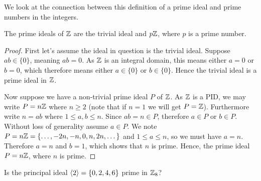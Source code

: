 We look at the connection between this definition of a prime ideal and prime numbers in the integers.
\begin{proposition}\label{prop-ideals-of-Z}
    The prime ideals of $\mathbb{Z}$ are the trivial ideal and $p\mathbb{Z}$, where $p$ is a prime number.
\end{proposition}
\begin{proof}
    First let's assume the ideal in question is the trivial ideal. Suppose $ab \in \{0\}$, meaning $ab = 0$. As $\mathbb{Z}$ is an integral domain, this means either $a = 0$ or $b = 0$, which therefore means either $a \in \{0\}$ or $b \in \{0\}$. Hence the trivial ideal is a prime ideal in $\mathbb{Z}$.

    Now suppose we have a non-trivial prime ideal $P$ of $\mathbb{Z}$. As $\mathbb{Z}$ is a PID, we may write $P = n\mathbb{Z}$ where $n \geq 2$ (note that if $n = 1$ we will get $P = \mathbb{Z}$). Furthermore write $n = ab$ where $1 \leq a,b \leq n$. Since $ab = n \in P$, therefore $a \in P$ or $b \in P$. Without loss of generality assume $a \in P$. We note $P = n\mathbb{Z} = \{\dots, -2n, -n, 0, n, 2n, \dots\}$ and $1 \leq a \leq n$, so we must have $a = n$. Therefore $a = n$ and $b = 1$, which shows that $n$ is prime. Hence, the prime ideal $P = n\mathbb{Z}$, where $n$ is prime.
\end{proof}
\begin{exercise}
    Is the principal ideal $\left\langle2\right\rangle = \{0, 2, 4, 6\}$ prime in $\mathbb{Z}_8$?
\end{exercise}

